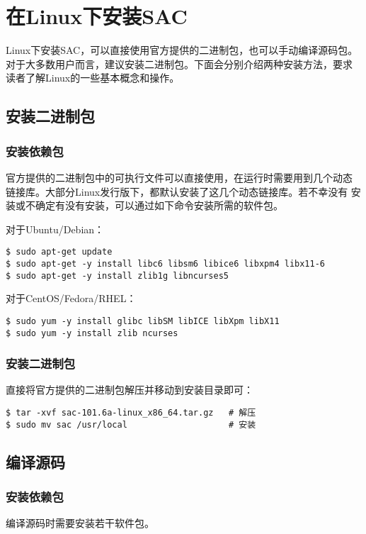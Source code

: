 \section{在Linux下安装SAC}
\label{sec:sac-install-for-linux}

Linux下安装SAC，可以直接使用官方提供的二进制包，也可以手动编译源码包。
对于大多数用户而言，建议安装二进制包。下面会分别介绍两种安装方法，要求
读者了解Linux的一些基本概念和操作。

\subsection{安装二进制包}
\subsubsection{安装依赖包}
官方提供的二进制包中的可执行文件可以直接使用，在运行时需要用到几个动态
链接库。大部分Linux发行版下，都默认安装了这几个动态链接库。若不幸没有
安装或不确定有没有安装，可以通过如下命令安装所需的软件包。

对于Ubuntu/Debian：
\begin{verbatim}
$ sudo apt-get update
$ sudo apt-get -y install libc6 libsm6 libice6 libxpm4 libx11-6
$ sudo apt-get -y install zlib1g libncurses5
\end{verbatim}

对于CentOS/Fedora/RHEL：
\begin{verbatim}
$ sudo yum -y install glibc libSM libICE libXpm libX11
$ sudo yum -y install zlib ncurses
\end{verbatim}

\subsubsection{安装二进制包}
直接将官方提供的二进制包解压并移动到安装目录即可：
\begin{verbatim}
$ tar -xvf sac-101.6a-linux_x86_64.tar.gz   # 解压
$ sudo mv sac /usr/local                    # 安装
\end{verbatim}

\subsection{编译源码}
\subsubsection{安装依赖包}
编译源码时需要安装若干软件包。

